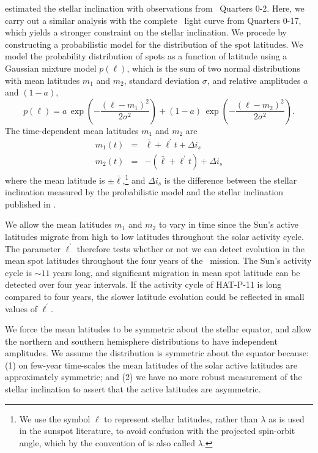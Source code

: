 \citet{Sanchis-Ojeda2011} estimated the stellar inclination with observations from \kepler\ Quarters 0-2. Here, we carry out a similar analysis with the complete \kepler\ light curve from Quarters 0-17, which yields a stronger constraint on the stellar inclination. We procede by constructing a probabilistic model for the distribution of the spot latitudes. We model the probability distribution of spots as a function of latitude using a Gaussian mixture model $p(\ell)$, which is the sum of two normal distributions with mean latitudes $m_1$ and $m_2$, standard deviation $\sigma$, and relative amplitudes $a$ and $(1 - a)$,
\begin{equation}
p(\ell) = a \, \exp(-\frac{(\ell - m_1)^2}{2\sigma^2}) + (1-a) \, \exp(-\frac{(\ell - m_2)^2}{2\sigma^2}).
\end{equation}
The time-dependent mean latitudes $m_1$ and $m_2$ are
\begin{eqnarray}
m_1(t) &=& \bar{\ell} + \ell^\prime t + \Delta i_s \\ 
m_2(t) &=& -(\bar{\ell} + \ell^\prime t) + \Delta i_s 
\end{eqnarray}
where the mean latitude is $\pm \bar{\ell}$,\footnote{We use the symbol $\ell$ to represent stellar latitudes, rather than $\lambda$ as is used in the sunspot literature, to avoid confusion with the projected spin-orbit angle, which by the convention of \citet{Ohta2005} is also called $\lambda$.} and $\Delta i_s$ is the difference between the stellar inclination measured by the probabilistic model and the stellar inclination published in \citet{Sanchis-Ojeda2011}. 

We allow the mean latitudes $m_1$ and $m_2$ to vary in time since the Sun's active latitudes migrate from high to low latitudes throughout the solar activity cycle. The parameter $\ell^\prime$ therefore tests whether or not we can detect evolution in the mean spot latitudes throughout the four years of the \kepler\ mission. The Sun's activity cycle is $\sim 11$ years long, and significant migration in mean spot latitude can be detected over four year intervals. If the activity cycle of HAT-P-11 is long compared to four years, the slower latitude evolution could be reflected in small values of $\ell^\prime$.

We force the mean latitudes to be symmetric about the stellar equator, and allow the northern and southern hemisphere distributions to have independent amplitudes. We assume the distribution is symmetric about the equator because: (1) on few-year time-scales the mean latitudes of the solar active latitudes are approximately symmetric; and (2) we have no more robust measurement of the stellar inclination to assert that the active latitudes are asymmetric. 

